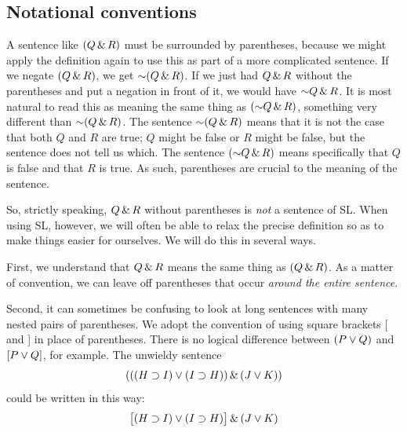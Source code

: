 
\subsection{Notational conventions}
\label{SLconventions}
A sentence like $(Q \,\&\, R)$ must be surrounded by parentheses, because we might apply the definition again to use this as part of a more complicated sentence. If we negate $(Q \,\&\, R)$, we get $\mathord{\sim}(Q \,\&\, R)$. If we just had $Q \,\&\, R$ without the parentheses and put a negation in front of it, we would have $\mathord{\sim} Q \,\&\, R$. It is most natural to read this as meaning the same thing as $(\mathord{\sim} Q \,\&\, R)$, something very different than $\mathord{\sim}(Q\,\&\, R)$. The sentence $\mathord{\sim}(Q \,\&\, R)$ means that it is not the case that both $Q$ and $R$ are true; $Q$ might be false or $R$ might be false, but the sentence does not tell us which. The sentence $(\mathord{\sim} Q \,\&\, R)$ means specifically that $Q$ is false and that $R$ is true. As such, parentheses are crucial to the meaning of the sentence.

So, strictly speaking, $Q \,\&\, R$ without parentheses is \emph{not} a sentence of SL. When using SL, however, we will often be able to relax the precise definition so as to make things easier for ourselves. We will do this in several ways.

First,  we understand that $Q \,\&\, R$ means the same thing as $(Q \,\&\, R)$. As a matter of convention, we can leave off parentheses that occur \emph{around the entire sentence}.

Second, it can sometimes be confusing to look at long sentences with many nested pairs of parentheses. We adopt the convention of using square brackets [ and ] in place of parentheses. There is no logical difference between $(P\vee Q)$ and $[P\vee Q]$, for example. The unwieldy sentence
$$(((H \supset I) \vee (I \supset H)) \,\&\, (J \vee K))$$
could be written in this way:
$$\bigl[(H \supset I) \vee (I \supset H)\bigr] \,\&\, (J \vee K)$$


